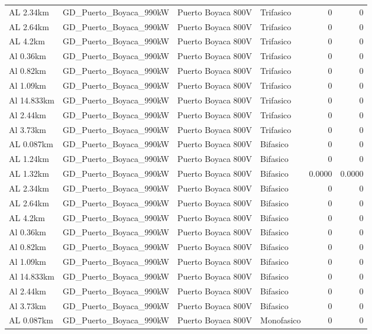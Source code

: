 \documentclass[11pt,a4paper]{article}
\begin{document}
\begin{longtable}{llllrr}
AL 2.34km & GD\_Puerto\_Boyaca\_990kW & Puerto Boyaca 800V & Trifasico & 0 & 0 \\
AL 2.64km & GD\_Puerto\_Boyaca\_990kW & Puerto Boyaca 800V & Trifasico & 0 & 0 \\
AL 4.2km & GD\_Puerto\_Boyaca\_990kW & Puerto Boyaca 800V & Trifasico & 0 & 0 \\
Al 0.36km & GD\_Puerto\_Boyaca\_990kW & Puerto Boyaca 800V & Trifasico & 0 & 0 \\
Al 0.82km & GD\_Puerto\_Boyaca\_990kW & Puerto Boyaca 800V & Trifasico & 0 & 0 \\
Al 1.09km & GD\_Puerto\_Boyaca\_990kW & Puerto Boyaca 800V & Trifasico & 0 & 0 \\
Al 14.833km & GD\_Puerto\_Boyaca\_990kW & Puerto Boyaca 800V & Trifasico & 0 & 0 \\
Al 2.44km & GD\_Puerto\_Boyaca\_990kW & Puerto Boyaca 800V & Trifasico & 0 & 0 \\
Al 3.73km & GD\_Puerto\_Boyaca\_990kW & Puerto Boyaca 800V & Trifasico & 0 & 0 \\
AL 0.087km & GD\_Puerto\_Boyaca\_990kW & Puerto Boyaca 800V & Bifasico & 0 & 0 \\
AL 1.24km & GD\_Puerto\_Boyaca\_990kW & Puerto Boyaca 800V & Bifasico & 0 & 0 \\
AL 1.32km & GD\_Puerto\_Boyaca\_990kW & Puerto Boyaca 800V & Bifasico & 0.0000 & 0.0000 \\
AL 2.34km & GD\_Puerto\_Boyaca\_990kW & Puerto Boyaca 800V & Bifasico & 0 & 0 \\
AL 2.64km & GD\_Puerto\_Boyaca\_990kW & Puerto Boyaca 800V & Bifasico & 0 & 0 \\
AL 4.2km & GD\_Puerto\_Boyaca\_990kW & Puerto Boyaca 800V & Bifasico & 0 & 0 \\
Al 0.36km & GD\_Puerto\_Boyaca\_990kW & Puerto Boyaca 800V & Bifasico & 0 & 0 \\
Al 0.82km & GD\_Puerto\_Boyaca\_990kW & Puerto Boyaca 800V & Bifasico & 0 & 0 \\
Al 1.09km & GD\_Puerto\_Boyaca\_990kW & Puerto Boyaca 800V & Bifasico & 0 & 0 \\
Al 14.833km & GD\_Puerto\_Boyaca\_990kW & Puerto Boyaca 800V & Bifasico & 0 & 0 \\
Al 2.44km & GD\_Puerto\_Boyaca\_990kW & Puerto Boyaca 800V & Bifasico & 0 & 0 \\
Al 3.73km & GD\_Puerto\_Boyaca\_990kW & Puerto Boyaca 800V & Bifasico & 0 & 0 \\
AL 0.087km & GD\_Puerto\_Boyaca\_990kW & Puerto Boyaca 800V & Monofasico & 0 & 0 \\

\end{longtable}
\end{document}
